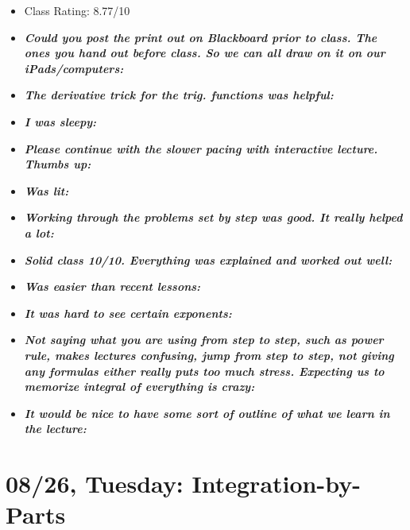\documentclass[11pt,letterpaper]{article}
\begin{document}
\begin{itemize}
\item Class Rating: 8.77/10
\item {\bfseries\itshape Could you post the print out on Blackboard prior to class. The ones you hand out before class. So we can all draw on it on our iPads/computers:} 
\item {\bfseries\itshape The derivative trick for the trig. functions was helpful:}
\item {\bfseries\itshape I was sleepy:}
\item {\bfseries\itshape Please continue with the slower pacing with interactive lecture. Thumbs up:}
\item {\bfseries\itshape Was lit:}
\item {\bfseries\itshape Working through the problems set by step was good. It really helped a lot:} 
\item {\bfseries\itshape Solid class 10/10. Everything was explained and worked out well:}
\item {\bfseries\itshape Was easier than recent lessons:} 
\item {\bfseries\itshape It was hard to see certain exponents:} 
\item {\bfseries\itshape Not saying what you are using from step to step, such as power rule, makes lectures confusing, jump from step to step, not giving any formulas either really puts too much stress. Expecting us to memorize integral of everything is crazy:} 
\item {\bfseries\itshape It would be nice to have some sort of outline of what we learn in the lecture:} 
\end{itemize}

\newpage
\section*{08/26, Tuesday: Integration-by-Parts\label{08-26}}
\end{document}
